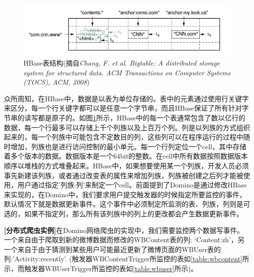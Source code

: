 \begin{figure}[]
\centering
\includegraphics[width=5in]{../figures/bigtable.pdf}
\caption{HBase表结构(摘自\textit{Chang, F. et al. Bigtable: A distributed storage system for structured data. ACM Transactions on Computer Systems (TOCS), ACM, 2008})}
\label{fig:hbase}
\end{figure}

众所周知，在HBase中，数据是以表为单位存储的。表中的元素通过使用行关键字来区分，每一个行关键字都可以是任意一个字节串，而且HBase保证了所有针对字节串的读写都是原子的。如图\ref{fig:hbase}所示，HBase中的每一个表通常包含了数以亿行的数据，每一个行最多可以存储上千个列族以及上百万个列。列是以列族的方式组织起来的，每一个列族中可能包含不定数目的列，这些列可以在程序运行的过程中随时增加，列族也是进行访问控制的最小单元。每一个行列定位一个cell，其中存储着多个版本的数据。数据版本是一个64bit的整数。在cell中所有数据按照数据版本顺序以堆栈的方式堆叠起来。HBase中，如果想要使用某一个列族，开发人员必须事先新建该列族，或者通过改变表的属性来增加列族，列族被创建之后列才能被使用，用户通过指定’列族:列’来制定一个cell。前面提到了Domino是通过修改HBase来实现的，在Domino中，我们要求用户提交触发器的时候指定所要监控的事件，默认情况下就是数据更新事件。这个事件中必须制定所监测的表、列族，列则是可选的，如果不指定列，那么所有该列族中的列上的更改都会产生数据更新事件。


\begin{Sbox}
\begin{minipage}{5in}
\setlength\parindent{1pc}
\textbf{[分布式爬虫实例]}在Domino网络爬虫的实现中，我们需要监控两个数据写事件。一个来自由于爬取到新的微博数据而修改的WBContent表的列: ‘Content:zh’，另一个来自于由于猜测到某些用户可能最近更新了微博页面的WBUser表的列:’Activity:recently’. (触发器WBContentTrigger所监控的表如\ref{table:wbcontent}所示，而触发器WBUserTrigger所监控的表如\ref{table:wbuser}所示)。
\end{minipage}
\end{Sbox}
\shadowbox{\TheSbox}


